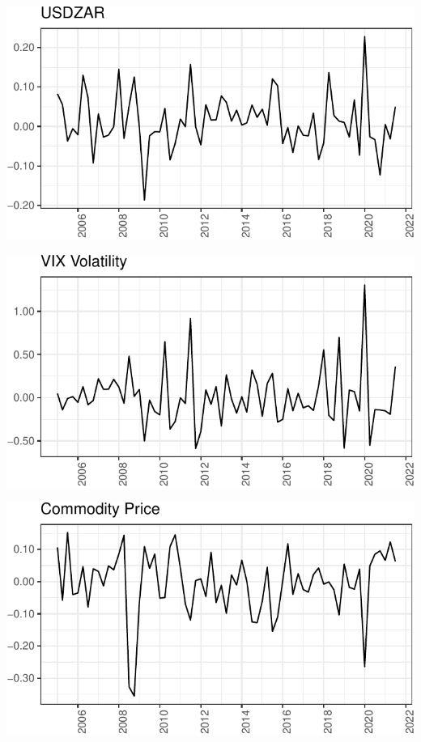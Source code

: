 \documentclass[11pt,preprint, authoryear]{elsarticle}
\let\origfigure\figure
\let\endorigfigure\endfigure
\renewenvironment{figure}[1][2] {
    \expandafter\origfigure\expandafter[H]
} {
    \endorigfigure
}
\numberwithin{equation}{section}
\numberwithin{figure}{section}
\numberwithin{table}{section}
\begin{document}
\begin{figure}[H]
\includegraphics{Factor-Model_files/figure-latex/unnamed-chunk-4-1} \caption{USDZAR Spot Price \label{Fig2}}\label{fig:unnamed-chunk-4}
\end{figure}

\begin{figure}[H]
\includegraphics{Factor-Model_files/figure-latex/unnamed-chunk-5-1} \caption{CBOE VIX Volatility Index \label{Fig3}}\label{fig:unnamed-chunk-5}
\end{figure}

\begin{figure}[H]
\includegraphics{Factor-Model_files/figure-latex/unnamed-chunk-6-1} \caption{Bloomberg Commodity Price Index \label{Fig4}}\label{fig:unnamed-chunk-6}
\end{figure}
\end{document}
